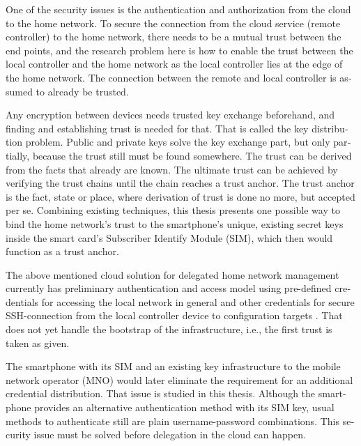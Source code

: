 \documentclass[12pt,a4paper,english]{tutthesis}
\begin{document}
\begin{otherlanguage}{english}
One of the security issues is the authentication and authorization 
from the cloud to the home network.
To secure the connection from the cloud service (remote controller)
to the home network, there needs to be a mutual trust between the end
points, and the research problem here is how to enable the trust between the
local controller and the home network as the local controller lies at the edge of the
home network. The connection between the remote and local
controller is assumed to already be trusted.



Any encryption between devices needs trusted key exchange beforehand,
and finding and establishing trust is needed for that.  That is called
the key distribution problem. Public and private keys solve the key exchange part, but
only partially, because the trust still must be found somewhere.
The trust can be derived from the facts that already are known.  
The ultimate trust can be achieved by verifying the trust chains 
until the chain reaches a trust anchor.
The trust anchor is the fact, state or place,
where derivation of trust is done no more, but accepted per se.
Combining existing techniques, this thesis presents one possible way
to bind the home network's trust to the smartphone's unique, existing
secret keys inside the smart card's Subscriber Identify Module (SIM),
which then would function as a trust anchor. 



The above mentioned cloud solution for delegated home network
management currently has preliminary authentication and access model
using pre-defined credentials for accessing the local network in general and other
credentials for secure SSH-connection from the local
controller device to configuration
targets \cite[Chap.4]{silverajan2015collaborative}.
That does not yet handle the bootstrap of the 
infrastructure, i.e., the first trust is taken as given. 

The smartphone with its SIM and an
existing key infrastructure to the mobile
network operator (MNO) would later eliminate the requirement for an
additional credential distribution. That issue is studied in this
thesis.  Although the smartphone provides an alternative authentication
method with its SIM key, usual methods to authenticate still are plain
username-password combinations.  This security issue must be solved
before delegation in the cloud can happen.












\end{otherlanguage}
\end{document}
